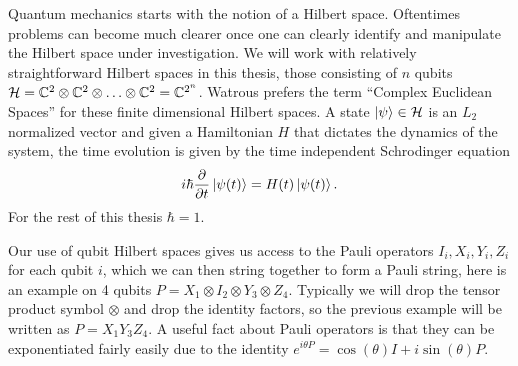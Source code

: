 Quantum mechanics starts with the notion of a Hilbert space. Oftentimes problems can become much clearer once one can clearly identify and manipulate the Hilbert space under investigation. We will work with relatively straightforward Hilbert spaces in this thesis, those consisting of $n$ qubits $\mathcal{H} = \mathbb{C}^{2} \otimes \mathbb{C}^2 \otimes \ldots \otimes \mathbb{C}^2 = \mathbb{C}^{2^n}$. Watrous prefers the term ``Complex Euclidean Spaces'' for these finite dimensional Hilbert spaces. A state $\ket{\psi} \in \mathcal{H}$ is an $L_2$ normalized vector and given a Hamiltonian $H$ that dictates the dynamics of the system, the time evolution is given by the time independent Schrodinger equation
\begin{equation}
    i \hbar \frac{\partial}{\partial t} \ket{\psi(t)} = H(t) \ket{\psi(t)}.
\end{equation}
For the rest of this thesis $\hbar = 1$. 

Our use of qubit Hilbert spaces gives us access to the Pauli operators $I_i, X_i, Y_i, Z_i$ for each qubit $i$, which we can then string together to form a Pauli string, here is an example on 4 qubits $P = X_1 \otimes I_2 \otimes Y_3 \otimes Z_4$. Typically we will drop the tensor product symbol $\otimes$ and drop the identity factors, so the previous example will be written as $P = X_1 Y_3 Z_4$. A useful fact about Pauli operators is that they can be exponentiated fairly easily due to the identity $e^{i \theta P} = \cos(\theta) I + i \sin(\theta) P$.







